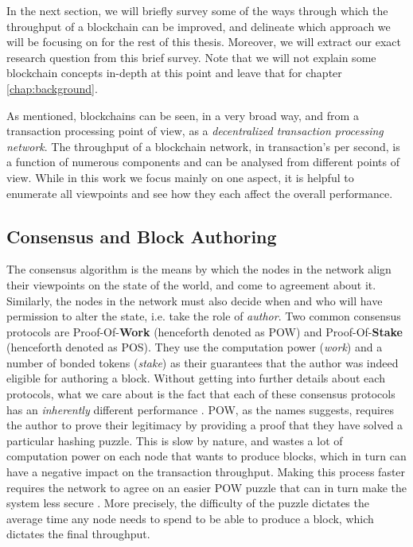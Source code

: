 In the next section, we will briefly survey some of the ways through which the throughput of a
blockchain can be improved, and delineate which approach we will be focusing on for the rest of this
thesis. Moreover, we will extract our exact research question from this brief survey. Note that we
will not explain some blockchain concepts in-depth at this point and leave that for chapter
\ref{chap:background}.


As mentioned, blockchains can be seen, in a very broad way, and from a transaction processing point
of view, as a \textit{decentralized transaction processing network}. The throughput of a blockchain
network, in transaction's per second, is a function of numerous components and can be analysed from
different points of view. While in this work we focus mainly on one aspect, it is helpful to
enumerate all viewpoints and see how they each affect the overall performance.

\subsection{Consensus and Block Authoring}

The consensus algorithm is the means by which the nodes in the network align their viewpoints on the
state of the world, and come to agreement about it. Similarly, the nodes in the network must also
decide when and who will have permission to alter the state, i.e. take the role of \textit{author}.
Two common consensus protocols are Proof-Of-\textbf{Work} (henceforth denoted as POW) and
Proof-Of-\textbf{Stake} (henceforth denoted as POS). They use the computation power (\textit{work})
and a number of bonded tokens (\textit{stake}) as their guarantees that the author was indeed
eligible for authoring a block. Without getting into further details about each protocols, what we
care about is the fact that each of these consensus protocols has an \textit{inherently} different
performance \cite{survey_on_all}. POW, as the names suggests, requires the author to prove their
legitimacy by providing a proof that they have solved a particular hashing puzzle. This is slow by
nature, and wastes a lot of computation power on each node that wants to produce blocks, which in
turn can have a negative impact on the transaction throughput. Making this process faster requires
the network to agree on an easier POW puzzle that can in turn make the system less secure
\cite{security_of_bitcoin}. More precisely, the difficulty of the puzzle dictates the average time
any node needs to spend to be able to produce a block, which dictates the final throughput.

